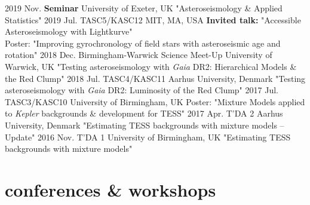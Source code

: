 \documentclass[letterpaper]{k-cv} %
\begin{document}
\begin{entrylist}
\entry
{2019 Nov.}
{\textbf{\textcolor{c1}{Seminar}}}
{University of Exeter, UK}
{"Asteroseismology \& Applied Statistics"}
\entry
{2019 Jul.}
{TASC5/KASC12}
{MIT, MA, USA}
{\textbf{\textcolor{c1}{Invited talk:}} "Accessible Asteroseismology with Lightkurve"\\ \small{Poster: "Improving gyrochronology of field stars with asteroseismic age and rotation"}}
\entry
{2018 Dec.}
{Birmingham-Warwick Science Meet-Up}
{University of Warwick, UK}
{"Testing asteroseismology with \textit{Gaia} DR2: Hierarchical Models \& the Red Clump"}
\entry
{2018 Jul.}
{TASC4/KASC11}
{Aarhus University, Denmark}
{"Testing asteroseismology with \textit{Gaia} DR2: Luminosity of the Red Clump"}
\entry
{2017 Jul.}
{TASC3/KASC10}
{University of Birmingham, UK}
{\small{Poster: "Mixture Models applied to \emph{Kepler} backgrounds \& development for TESS"}}
\entry
{2017 Apr.}
{T'DA 2}
{Aarhus University, Denmark}
{"Estimating TESS backgrounds with mixture models -- Update"}
\entry
{2016 Nov.}
{T'DA 1}
{University of Birmingham, UK}
{"Estimating TESS backgrounds with mixture models"}
\end{entrylist}

\section{\color{c2}conferences \& workshops}
\end{document}
